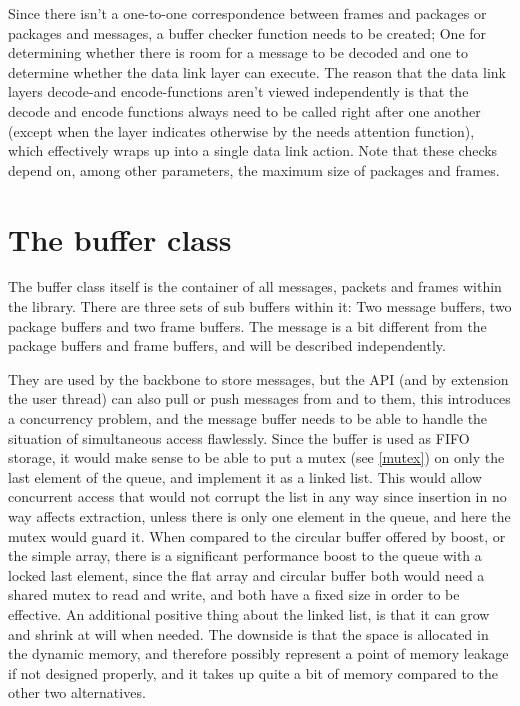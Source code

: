 Since there isn't a one-to-one correspondence between frames and packages or packages and messages, a buffer checker function needs to be created; One for determining whether there is room for a message to be decoded and one to determine whether the data link layer can execute. The reason that the data link layers decode-and encode-functions aren't viewed independently is that the decode and encode functions always need to be called right after one another (except when the layer indicates otherwise by the needs attention function), which effectively wraps up into a single data link action.
Note that these checks depend on, among other parameters, the maximum size of packages and frames.





\section{The buffer class}
The buffer class itself is the container of all messages, packets and frames within the library. There are three sets of sub buffers within it: Two message buffers, two package buffers and two frame buffers. 
The message is a bit different from the package buffers and frame buffers, and will be described independently. 

They are used by the backbone to store messages, but the API (and by extension the user thread) can also pull or push messages from and to them, this introduces a concurrency problem, and the message buffer needs to be able to handle the situation of simultaneous access flawlessly.
Since the buffer is used as FIFO storage, it would make sense to be able to put a mutex (see \ref{mutex}) on only the last element of the queue, and implement it as a linked list.
This would allow concurrent access that would not corrupt the list in any way since insertion in no way affects extraction, unless there is only one element in the queue, and here the mutex would guard it.
When compared to the circular buffer offered by boost, or the simple array, there is a significant performance boost to the queue with a locked last element, since the flat array and circular buffer both would need a shared mutex to read and write, and both have a fixed size in order to be effective.
An additional positive thing about the linked list, is that it can grow and shrink at will when needed. The downside is that the space is allocated in the dynamic memory, and therefore possibly represent a point of memory leakage if not designed properly, and it takes up quite a bit of memory compared to the other two alternatives.

